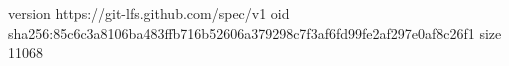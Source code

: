 version https://git-lfs.github.com/spec/v1
oid sha256:85c6c3a8106ba483ffb716b52606a379298c7f3af6fd99fe2af297e0af8c26f1
size 11068
